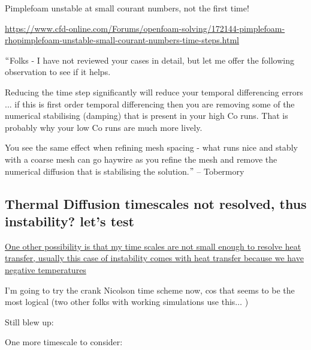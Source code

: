 \documentclass[12pt]{article}
\renewcommand{\_}{\kern-1.5pt\textunderscore\kern-1.5pt}
\begin{document}
Pimplefoam unstable at small courant numbers, not the first time!\par

\href{https://www.cfd-online.com/Forums/openfoam-solving/172144-pimplefoam-rhopimplefoam-unstable-small-courant-numbers-time-steps.html}{https://www.cfd-online.com/Forums/openfoam-solving/172144-pimplefoam-rhopimplefoam-unstable-small-courant-numbers-time-steps.html}\par


\vspace{\baselineskip}
\textcolor[HTML]{4472C4}{$``$Folks - I have not reviewed your cases in detail, but let me offer the following observation to see if it helps.}\par


\vspace{\baselineskip}
\textcolor[HTML]{4472C4}{Reducing the time step significantly will reduce your temporal differencing errors ... if this is first order temporal differencing then you are removing some of the numerical stabilising (damping) that is present in your high Co runs. That is probably why your low Co runs are much more lively.}\par


\vspace{\baselineskip}
\textcolor[HTML]{4472C4}{You see the same effect when refining mesh spacing - what runs nice and stably with a coarse mesh can go haywire as you refine the mesh and remove the numerical diffusion that is stabilising the solution.$"$  – Tobermory}\par

\subsection{Thermal Diffusion timescales not resolved, thus instability? let's test}

\uline{One other possibility is that my time scales are not small enough to resolve heat transfer, usually this case of instability comes with heat transfer because we have negative temperatures}\par


I’m going to try the crank Nicolson time scheme now, cos that seems to be the most logical (two other folks with working simulations use this$ \ldots $ ) \par

Still blew up:\par

One more timescale to consider:\par
\end{document}
